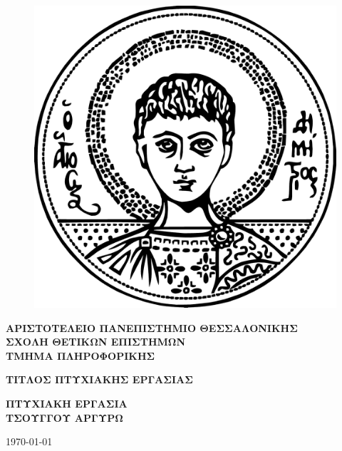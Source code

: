 \begin{figure}[h] %
\vspace*{-1cm}
\centering
\includegraphics[scale=0.35]{pictures/AUThLogo.png}
\end{figure}

\begin{center}
 { \large \bf ΑΡΙΣΤΟΤΕΛΕΙΟ ΠΑΝΕΠΙΣΤΗΜΙΟ ΘΕΣΣΑΛΟΝΙΚΗΣ
  \\ ΣΧΟΛΗ ΘΕΤΙΚΩΝ ΕΠΙΣΤΗΜΩΝ 
   \\ΤΜΗΜΑ ΠΛΗΡΟΦΟΡΙΚΗΣ
    \\}
\vspace{2cm}

{\large \bf ΤΙΤΛΟΣ ΠΤΥΧΙΑΚΗΣ ΕΡΓΑΣΙΑΣ}
    
\vspace{2.5cm}

{\large \bf ΠΤΥΧΙΑΚΗ ΕΡΓΑΣΙΑ
\\ ΤΣΟΥΓΓΟΥ ΑΡΓΥΡΩ}
  \\
  
  \vspace{2cm}
  
  {}
  \vfill 
    
    {\large \today}
\end{center}